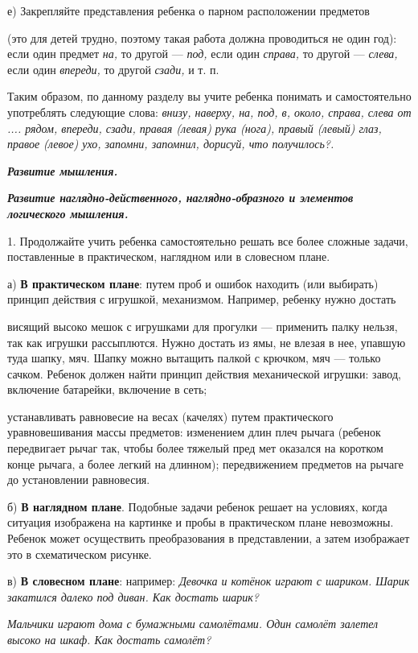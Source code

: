 \documentclass[a5paper]{book}
\renewcommand{\emph}[1]{\textit{#1}}
\begin{document}
е) Закрепляйте представления ребенка о парном расположении предметов

(это для детей трудно, поэтому такая работа должна проводиться не один
год): если один предмет \emph{на,} то другой --- \emph{под,} если один
\emph{справа,} то другой --- \emph{слева,} если один \emph{впереди,} то
другой \emph{сзади,} и т. п.

Таким образом, по данному разделу вы учите ребенка понимать и
самостоятельно употреблять следующие слова: \emph{внизу, наверху, на,
под, в, около, справа, слева от .... рядом, впереди, сзади, правая
(левая) рука (нога), правый (левый) глаз, правое (левое) ухо, запомни,
запомнил, дорисуй, что получилось?.}

\emph{\textbf{Развитие мышления.}}

\emph{\textbf{Развитие наглядно-действенного, наглядно-образного и
элементов логического мышления.}}

1. Продолжайте учить ребенка самостоятельно решать все более сложные
задачи, поставленные в практическом, наглядном или в словесном плане.

а) \textbf{В практическом плане}: путем проб и ошибок находить (или
выбирать) принцип действия с игрушкой, механизмом. Например, ребенку
нужно достать

висящий высоко мешок с игрушками для прогулки --- применить палку
нельзя, так как игрушки рассыплются. Нужно достать из ямы, не влезая в
нее, упавшую туда шапку, мяч. Шапку можно вытащить палкой с крючком, мяч
--- только сачком. Ребенок должен найти принцип действия механической
игрушки: завод, включение батарейки, включение в сеть;

устанавливать равновесие на весах (качелях) путем практического
уравновешивания массы предметов: изменением длин плеч рычага (ребенок
передвигает рычаг так, чтобы более тяжелый пред мет оказался на коротком
конце рычага, а более легкий на длинном); передвижением предметов на
рычаге до установлении равновесия.

б) \textbf{В наглядном плане}. Подобные задачи ребенок решает на
условиях, когда ситуация изображена на картинке и пробы в практическом
плане невозможны. Ребенок может осуществить преобразования в
представлении, а затем изображает это в схематическом рисунке.

в) \textbf{В словесном плане}: например: \emph{Девочка и котёнок играют
с шариком. Шарик закатился далеко под диван. Как достать шарик?}

\emph{Мальчики играют дома с бумажными самолётами. Один самолёт залетел
высоко на шкаф. Как достать самолёт?}
\end{document}
